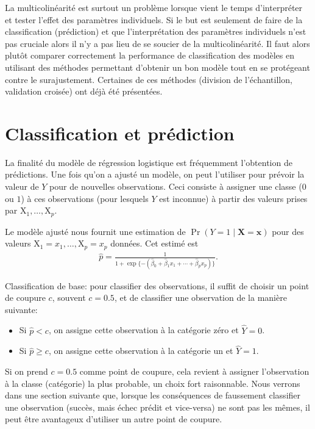 \documentclass[
  11pt,
  letterpaper,
]{book}
\providecommand{\tightlist}{%
  \setlength{\itemsep}{0pt}\setlength{\parskip}{0pt}}\usepackage{longtable,booktabs,array}
\theoremstyle{definition}
\theoremstyle{remark}
\begin{document}
La multicolinéarité est surtout un problème lorsque vient le temps
d'interpréter et tester l'effet des paramètres individuels. Si le but
est seulement de faire de la classification (prédiction) et que
l'interprétation des paramètres individuels n'est pas cruciale alors il
n'y a pas lieu de se soucier de la multicolinéarité. Il faut alors
plutôt comparer correctement la performance de classification des
modèles en utilisant des méthodes permettant d'obtenir un bon modèle
tout en se protégeant contre le surajustement. Certaines de ces méthodes
(division de l'échantillon, validation croisée) ont déjà été présentées.

\hypertarget{classification-et-pruxe9diction}{%
\section{Classification et
prédiction}\label{classification-et-pruxe9diction}}

La finalité du modèle de régression logistique est fréquemment
l'obtention de prédictions. Une fois qu'on a ajusté un modèle, on peut
l'utiliser pour prévoir la valeur de \(Y\) pour de nouvelles
observations. Ceci consiste à assigner une classe (\(0\) ou \(1\)) à ces
observations (pour lesquels \(Y\) est inconnue) à partir des valeurs
prises par \(\mathrm{X}_1, \ldots, \mathrm{X}_p\).

Le modèle ajusté nous fournit une estimation de
\(\Pr(Y=1 \mid \mathbf{X}=\boldsymbol{x})\) pour des valeurs
\(\mathrm{X}_1=x_1, \ldots, \mathrm{X}_p=x_p\) données. Cet estimé est
\begin{align*}
 \widehat{p} = \frac{1}{1+ \exp\{- ( \widehat{\beta}_0 + \widehat{\beta}_1x_1 + \cdots + \widehat{\beta}_p x_p)\}}.
\end{align*}

Classification de base: pour classifier des observations, il suffit de
choisir un point de coupure \(c\), souvent \(c=0.5\), et de classifier
une observation de la manière suivante:

\begin{itemize}
\tightlist
\item
  Si \(\widehat{p} < c\), on assigne cette observation à la catégorie
  zéro et \(\widehat{Y}=0\).
\item
  Si \(\widehat{p} \geq c\), on assigne cette observation à la catégorie
  un et \(\widehat{Y}=1\).
\end{itemize}

Si on prend \(c=0.5\) comme point de coupure, cela revient à assigner
l'observation à la classe (catégorie) la plus probable, un choix fort
raisonnable. Nous verrons dans une section suivante que, lorsque les
conséquences de faussement classifier une observation (succès, mais
échec prédit et vice-versa) ne sont pas les mêmes, il peut être
avantageux d'utiliser un autre point de coupure.
\end{document}
